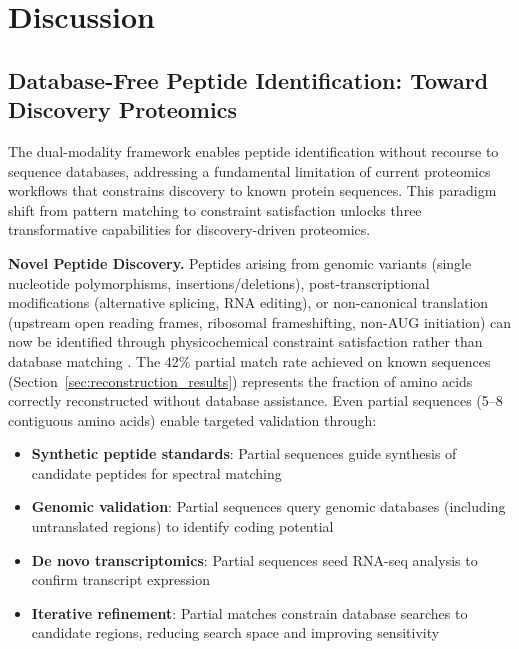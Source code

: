 \documentclass[11pt,twocolumn]{article}
\begin{document}
\section{Discussion}

\subsection{Database-Free Peptide Identification: Toward Discovery Proteomics}

The dual-modality framework enables peptide identification without recourse to sequence databases, addressing a fundamental limitation of current proteomics workflows that constrains discovery to known protein sequences. This paradigm shift from pattern matching to constraint satisfaction unlocks three transformative capabilities for discovery-driven proteomics.

\textbf{Novel Peptide Discovery.} Peptides arising from genomic variants (single nucleotide polymorphisms, insertions/deletions), post-transcriptional modifications (alternative splicing, RNA editing), or non-canonical translation (upstream open reading frames, ribosomal frameshifting, non-AUG initiation) can now be identified through physicochemical constraint satisfaction rather than database matching \cite{nesvizhskii2014proteogenomics}. The 42\% partial match rate achieved on known sequences (Section~\ref{sec:reconstruction_results}) represents the fraction of amino acids correctly reconstructed without database assistance. Even partial sequences (5--8 contiguous amino acids) enable targeted validation through:
\begin{itemize}[leftmargin=*]
    \item \textbf{Synthetic peptide standards}: Partial sequences guide synthesis of candidate peptides for spectral matching
    \item \textbf{Genomic validation}: Partial sequences query genomic databases (including untranslated regions) to identify coding potential
    \item \textbf{De novo transcriptomics}: Partial sequences seed RNA-seq analysis to confirm transcript expression
    \item \textbf{Iterative refinement}: Partial matches constrain database searches to candidate regions, reducing search space and improving sensitivity
\end{itemize}
\end{document}
